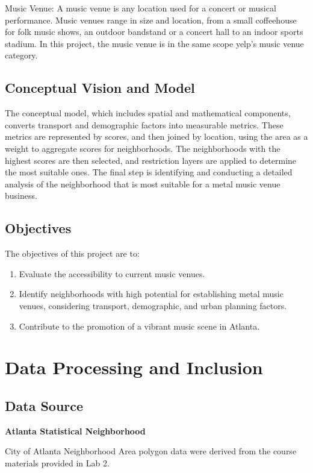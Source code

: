 \documentclass[11pt]{article}
\begin{document}
Music Venue: A music venue is any location used for a concert or musical performance. Music venues range in size and location, from a small coffeehouse for folk music shows, an outdoor bandstand or a concert hall to an indoor sports stadium.  In this project, the music venue is in the same scope yelp's music venue category.


\subsection{Conceptual Vision and Model}
The conceptual model, which includes spatial and mathematical components, converts transport and demographic factors into measurable metrics. These metrics are represented by scores, and then joined by location, using the area as a weight to aggregate scores for neighborhoods. The neighborhoods with the highest scores are then selected, and restriction layers are applied to determine the most suitable ones. The final step is identifying and conducting a detailed analysis of the neighborhood that is most suitable for a metal music venue business.

\subsection{Objectives}
The objectives of this project are to:
\begin{enumerate}
\item{Evaluate the accessibility to current music venues.}
\item{Identify neighborhoods with high potential for establishing metal music venues, considering transport, demographic, and urban planning factors.}
\item{Contribute to the promotion of a vibrant music scene in Atlanta.}
\end{enumerate}

\section{Data Processing and Inclusion}

\subsection{Data Source}

\textbf{Atlanta Statistical Neighborhood}

City of Atlanta Neighborhood Area polygon data were derived from the course materials provided in Lab 2.
\end{document}
